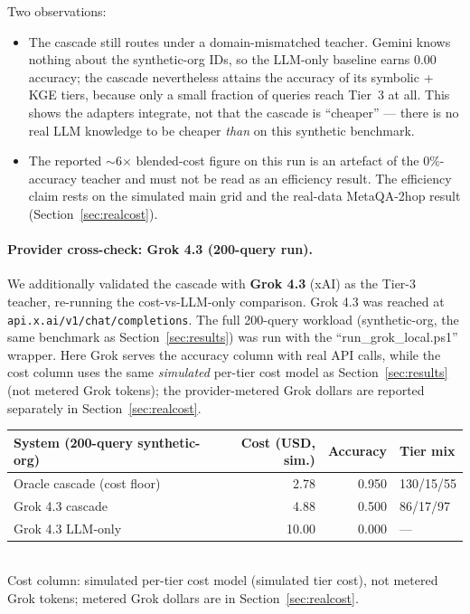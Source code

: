 \documentclass[11pt]{article}
\theoremstyle{plain}
\begin{document}

Two observations:

\begin{itemize}
\item The cascade still routes under a domain-mismatched teacher. Gemini knows
nothing about the synthetic-org IDs, so the LLM-only baseline earns \(0.00\)
accuracy; the cascade nevertheless attains the accuracy of its symbolic + KGE
tiers, because only a small fraction of queries reach Tier~3 at all. This shows
the adapters integrate, not that the cascade is ``cheaper'' --- there is no real
LLM knowledge to be cheaper \emph{than} on this synthetic benchmark.
\item The reported $\sim$6$\times$ blended-cost figure on this run is an
artefact of the $0\%$-accuracy teacher and must not be read as an efficiency
result. The efficiency claim rests on the simulated main grid and the real-data
MetaQA-2hop result (Section~\ref{sec:realcost}).
\end{itemize}

\paragraph{Provider cross-check: Grok 4.3 (200-query run).}
We additionally validated the cascade with \textbf{Grok 4.3} (xAI)
as the Tier-3 teacher, re-running the cost-vs-LLM-only comparison.
Grok 4.3 was reached at
\texttt{api.x.ai/v1/chat/completions}.  The full
200-query workload (synthetic-org, the same benchmark as
Section~\ref{sec:results}) was run with the
``run\_grok\_local.ps1'' wrapper. Here Grok serves the accuracy column with
real API calls, while the cost column uses the same \emph{simulated} per-tier
cost model as Section~\ref{sec:results} (not metered Grok tokens); the
provider-metered Grok dollars are reported separately in
Section~\ref{sec:realcost}.

\begin{center}\small
\begin{tabular}{lrrl}
\toprule
System (200-query synthetic-org) & Cost (USD, sim.) & Accuracy & Tier mix \\
\midrule
Oracle cascade (cost floor) & 2.78  & 0.950 & 130/15/55 \\
Grok 4.3 cascade            & 4.88  & 0.500 &  86/17/97 \\
Grok 4.3 LLM-only           & 10.00 & 0.000 &     ---   \\
\bottomrule
\end{tabular}\\[3pt]
{\footnotesize Cost column: simulated per-tier cost model (simulated tier cost),
not metered Grok tokens; metered Grok dollars are in Section~\ref{sec:realcost}.}
\end{center}
\end{document}

